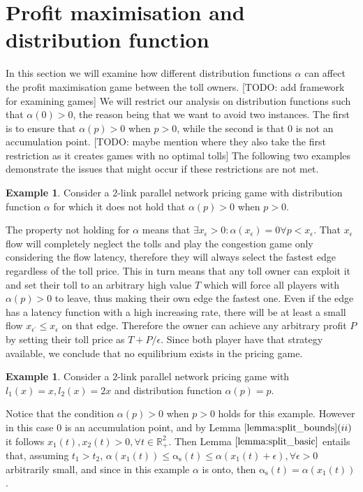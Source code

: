 \documentclass[10pt,a4paper]{book}
\newcommand{\as}{\mathrm{\alpha_s}}
\newcommand{\R}{\mathbb{R}}
\theoremstyle{definition}
\theoremstyle{comment}
\newtheorem{example}[definition]{Example}
\begin{document}
\section{Profit maximisation and distribution function}

In this section we will examine how different distribution functions $\alpha$ can affect the profit maximisation game between the toll owners.
[TODO: add framework for examining games]
We will restrict our analysis on distribution functions such that $\alpha(0) > 0$, the reason being that we want to avoid two instances.
The first is to ensure that $\alpha(p) > 0$ when $p > 0$, while the second is that $0$ is not an accumulation point.
[TODO: maybe mention \cite{10.1145/780542.780618} where they also take the first restriction as it creates games with no optimal tolls]
The following two examples demonstrate the issues that might occur if these restrictions are not met.

\begin{example}
	Consider a $2$-link parallel network pricing game with distribution function $\alpha$ for which it does not hold that $\alpha(p) > 0$ when $p > 0$.
\end{example}

The property not holding for $\alpha$ means that $\exists x_\epsilon > 0 : \alpha(x_\epsilon) = 0 \forall p < x_\epsilon$.
That $x_\epsilon$ flow will completely neglect the tolls and play the congestion game only considering the flow latency, therefore they will always select the fastest edge regardless of the toll price.
This in turn means that any toll owner can exploit it and set their toll to an arbitrary high value $T$ which will force all players with $\alpha(p) > 0$ to leave, thus making their own edge the fastest one.
Even if the edge has a latency function with a high increasing rate, there will be at least a small flow $x_{\epsilon^\prime} \le x_\epsilon$ on that edge.
Therefore the owner can achieve any arbitrary profit $P$ by setting their toll price as $T + P/\epsilon$.
Since both player have that strategy available, we conclude that no equilibrium exists in the pricing game.

\begin{example}
	\label{example:a_0_ap}
	Consider a $2$-link parallel network pricing game with $l_1(x) = x, l_2(x) = 2x$ and distribution function $\alpha(p) = p$.
\end{example}

Notice that the condition $\alpha(p) > 0$ when $p > 0$ holds for this example.
However in this case $0$ is an accumulation point, and by Lemma $\ref{lemma:split_bounds}(ii)$ it follows $x_1(t), x_2(t) > 0, \forall t \in \R_+^2$.
Then Lemma $\ref{lemma:split_basic}$ entails that, assuming $t_1 > t_2$, $\alpha(x_1(t)) \le \as(t) \le \alpha(x_1(t) + \epsilon), \forall \epsilon > 0$ arbitrarily small, and since in this example $\alpha$ is onto, then $\as(t) = \alpha(x_1(t))$.
\end{document}
